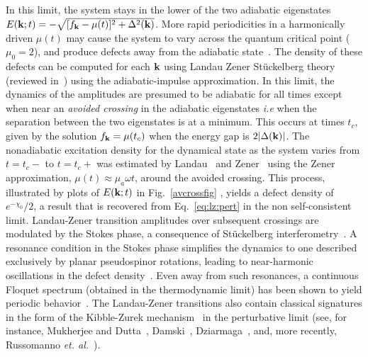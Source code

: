 \documentclass[aps,pra,floats,epsfig,pdflatex]{revtex4}                                                              %
\begin{document}
 {In this limit, the system stays in the lower of the two adiabatic eigenstates $E({\bf k};t)=-\sqrt{[f_{\bf k}-\mu(t)]^2+\Delta^2({\bf k})}$. More rapid periodicities in a harmonically driven $\mu(t)$ may cause the system to vary across the quantum critical point ($\mu_0=2$), and produce defects away from the adiabatic state~\cite{xyseminal,bikashbabu,review:lzstls}. The density of these defects can be computed for each ${\bf k}$ using Landau Zener St\"uckelberg theory~\cite{landau:lzformula, zener:lzformula} } (reviewed in~\cite{xyseminal,bikashbabu,review:lzstls}) using the adiabatic-impulse approximation. { In this limit, the dynamics of the amplitudes are presumed to be adiabatic for all times except when near an \textit{avoided crossing} in the adiabatic eigenstates \textit{i.e} when the separation between the two eigenstates is at a minimum. This occurs at times $t_c$, given by the solution $f_{\bf k}=\mu(t_c)$ when the energy gap is $2|\Delta({\bf k})|$. The nonadiabatic excitation density for the 
dynamical state as the 
system varies from $t=t_c-$ to $t=t_c+$ was estimated by Landau}~\cite{landau:lzformula} and Zener~\cite{zener:lzformula}  {using the Zener approximation, $\mu(t)\approx \mu_a\omega t$, around the avoided crossing. This process, illustrated by plots of $E({\bf k};t)$ in Fig.}~\ref{avcrossfig} {, yields a defect density of}~\cite{wittig:lzformula}  {$e^{-\chi_0}/2$, a result that is recovered from Eq.}~\ref{eq:lz:pert}  {in the non self-consistent limit. Landau-Zener transition amplitudes over subsequent crossings are modulated by the Stokes phase, a consequence of St\"uckelberg interferometry~\cite{xyseminal, review:lzstls}. A resonance condition in the Stokes phase simplifies the dynamics to one described exclusively by planar pseudospinor rotations, leading to near-harmonic oscillations in the defect density~\cite{xyseminal,rwa}. Even away from such resonances, a continuous Floquet spectrum (obtained in the thermodynamic limit) has been shown to yield periodic behavior~\cite{russomanno}. The Landau-Zener 
transitions also contain classical signatures in the form of the Kibble-Zurek mechanism~\cite{bikashbabu:ref} in the perturbative limit} (see, for instance, Mukherjee and Dutta~\cite{xyseminal}, Damski~\cite{damski}, Dziarmaga~\cite{dziarmaga2}, and, more recently, Russomanno \textit{et. al.}~\cite{russomanno}).  
 
\end{document}
